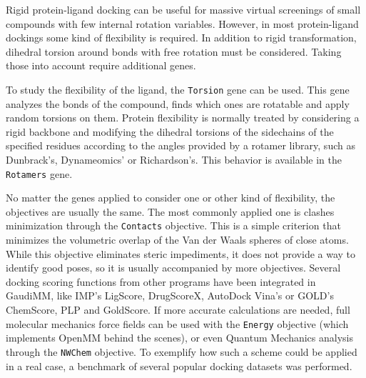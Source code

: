 Rigid protein-ligand docking can be useful for massive virtual screenings of small compounds with few internal rotation variables. However, in most protein-ligand dockings some kind of flexibility is required. In addition to rigid transformation, dihedral torsion around bonds with free rotation must be considered. Taking those into account require additional genes.

To study the flexibility of the ligand, the \texttt{Torsion} gene can be used. This gene analyzes the bonds of the compound, finds which ones are rotatable and apply random torsions on them. Protein flexibility is normally treated by considering a rigid backbone and modifying the dihedral torsions of the sidechains of the specified residues according to the angles provided by a rotamer library, such as Dunbrack's,\cite{dunbrack1993backbone} Dynameomics'\cite{scouras2011dynameomics} or Richardson's.\cite{lovell2000penultimate} This behavior is available in the \texttt{Rotamers} gene.

No matter the genes applied to consider one or other kind of flexibility, the objectives are usually the same. The most commonly applied one is clashes minimization through the \texttt{Contacts} objective. This is a simple criterion that minimizes the volumetric overlap of the Van der Waals spheres of close atoms. While this objective eliminates steric impediments, it does not provide a way to identify good poses, so it is usually accompanied by more objectives. Several docking scoring functions from other programs have been integrated in GaudiMM, like IMP's LigScore,\cite{krammer2005ligscore} DrugScoreX,\cite{neudert2011dsx} AutoDock Vina's\cite{trott2010autodock} or GOLD's ChemScore, PLP and GoldScore.\cite{verdonk2003improved} If more accurate calculations are needed, full molecular mechanics force fields can be used with the \texttt{Energy} objective (which implements OpenMM behind the scenes), or even Quantum Mechanics analysis through the \texttt{NWChem} objective. To exemplify how such a scheme could be applied in a real case, a benchmark of several popular docking datasets was performed.